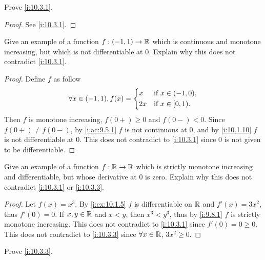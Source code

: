 \exercisesection

\begin{ex}\label{i:ex:10.3.1}
  Prove \cref{i:10.3.1}.
\end{ex}

\begin{proof}
  See \cref{i:10.3.1}.
\end{proof}

\begin{ex}\label{i:ex:10.3.2}
  Give an example of a function \(f : (-1, 1) \to \mathbb{R}\) which is continuous and monotone increasing, but which is not differentiable at \(0\).
  Explain why this does not contradict \cref{i:10.3.1}.
\end{ex}

\begin{proof}
  Define \(f\) as follow
  \[
    \forall x \in (-1, 1), f(x) = \begin{dcases}
      x  & \text{if } x \in (-1, 0), \\
      2x & \text{if } x \in [0, 1).
    \end{dcases}
  \]
  Then \(f\) is monotone increasing, \(f(0+) \geq 0\) and \(f(0-) < 0\).
  Since \(f(0+) \neq f(0-)\), by \cref{i:ac:9.5.1} \(f\) is not continuous at \(0\), and by \cref{i:10.1.10} \(f\) is not differentiable at \(0\).
  This does not contradict to \cref{i:10.3.1} since \(0\) is not given to be differentiable.
\end{proof}

\begin{ex}\label{i:ex:10.3.3}
  Give an example of a function \(f : \mathbb{R} \to \mathbb{R}\) which is strictly monotone increasing and differentiable, but whose derivative at \(0\) is zero.
  Explain why this does not contradict \cref{i:10.3.1} or \cref{i:10.3.3}.
\end{ex}

\begin{proof}
  Let \(f(x) = x^3\).
  By \cref{i:ex:10.1.5} \(f\) is differentiable on \(\mathbb{R}\) and \(f'(x) = 3x^2\), thus \(f'(0) = 0\).
  If \(x, y \in \mathbb{R}\) and \(x < y\), then \(x^3 < y^3\), thus by \cref{i:9.8.1} \(f\) is strictly monotone increasing.
  This does not contradict to \cref{i:10.3.1} since \(f'(0) = 0 \geq 0\).
  This does not contradict to \cref{i:10.3.3} since \(\forall x \in \mathbb{R}\), \(3x^2 \geq 0\).
\end{proof}

\begin{ex}\label{i:ex:10.3.4}
  Prove \cref{i:10.3.3}.
\end{ex}

